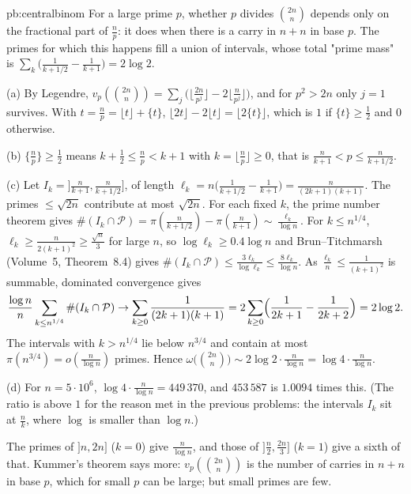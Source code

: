 \begin{solution}{pb:centralbinom}
\idea For a large prime $p$, whether $p$ divides $\binom{2n}n$ depends only on the fractional part of $\frac np$: it does when there is a carry in $n+n$ in base $p$. The primes for
which this happens fill a union of intervals, whose total "prime mass" is $\sum_k\bigl(\frac1{k+1/2}-\frac1{k+1}\bigr)=2\log2$.

\writeup (a) By Legendre, $v_p(\binom{2n}n)=\sum_j\bigl(\lfloor\frac{2n}{p^j}\rfloor-2\lfloor\frac n{p^j}\rfloor\bigr)$, and for $p^2>2n$ only $j=1$ survives. With $t=\frac np=\lfloor t\rfloor+\{t\}$,
$\lfloor2t\rfloor-2\lfloor t\rfloor=\lfloor2\{t\}\rfloor$, which is $1$ if $\{t\}\ge\frac12$ and $0$ otherwise.

(b) $\{\frac np\}\ge\frac12$ means $k+\frac12\le\frac np<k+1$ with $k=\lfloor\frac np\rfloor\ge0$, that is $\frac n{k+1}<p\le\frac n{k+1/2}$.

(c) Let $I_k=\bigl]\frac n{k+1},\frac n{k+1/2}\bigr]$, of length $\ell_k=n\bigl(\frac1{k+1/2}-\frac1{k+1}\bigr)=\frac n{(2k+1)(k+1)}$. The primes $\le\sqrt{2n}$ contribute at most $\sqrt{2n}$.
For each fixed $k$, the prime number theorem gives $\#(I_k\cap\mathcal P)=\pi(\frac n{k+1/2})-\pi(\frac n{k+1})\sim\frac{\ell_k}{\log n}$. For $k\le n^{1/4}$, $\ell_k\ge\frac n{2(k+1)^2}\ge\frac{\sqrt n}3$
for large $n$, so $\log\ell_k\ge0.4\log n$ and Brun--Titchmarsh (Volume~5, Theorem~8.4) gives $\#(I_k\cap\mathcal P)\le\frac{3\ell_k}{\log\ell_k}\le\frac{8\ell_k}{\log n}$. As $\frac{\ell_k}n\le\frac1{(k+1)^2}$
is summable, dominated convergence gives
\[
\frac{\log n}n\sum_{k\le n^{1/4}}\#(I_k\cap\mathcal P)\to\sum_{k\ge0}\frac1{(2k+1)(k+1)}=2\sum_{k\ge0}\Bigl(\frac1{2k+1}-\frac1{2k+2}\Bigr)=2\log2.
\]
The intervals with $k>n^{1/4}$ lie below $n^{3/4}$ and contain at most $\pi(n^{3/4})=o(\frac n{\log n})$ primes. Hence $\omega\bigl(\binom{2n}n\bigr)\sim2\log2\cdot\frac n{\log n}=\log4\cdot\frac n{\log n}$.

(d) For $n=5\cdot10^6$, $\log4\cdot\frac n{\log n}=449\,370$, and $453\,587$ is $1.0094$ times this. (The ratio is above $1$ for the reason met in the previous problems: the
intervals $I_k$ sit at $\frac nk$, where $\log$ is smaller than $\log n$.)

\leads The primes of $]n,2n]$ ($k=0$) give $\frac n{\log n}$, and those of $]\frac n2,\frac{2n}3]$ ($k=1$) give a sixth of that. Kummer's theorem says more: $v_p(\binom{2n}n)$ is the number of carries in $n+n$ in base $p$,
which for small $p$ can be large; but small primes are few.
\end{solution}

